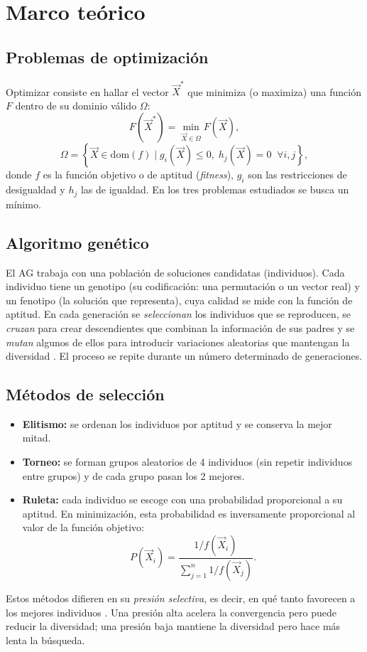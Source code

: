 \documentclass[conference]{IEEEtran}
\begin{document}
\section{Marco te\'orico}
\subsection{Problemas de optimizaci\'on}
Optimizar consiste en hallar el vector $\vec{X}^*$ que minimiza (o maximiza) una funci\'on $F$ dentro de su dominio v\'alido $\Omega$:
\begin{equation}
F(\vec{X}^*) = \min_{\vec{X}\in\Omega} F(\vec{X}),
\end{equation}
\begin{equation}
\Omega = \left\{\vec{X}\in \mathrm{dom}(f) \mid g_i(\vec{X})\le 0,\; h_j(\vec{X})=0 \;\; \forall i,j \right\},
\end{equation}
donde $f$ es la funci\'on objetivo o de aptitud (\emph{fitness}), $g_i$ son las restricciones de desigualdad y $h_j$ las de igualdad. En los tres problemas estudiados se busca un m\'inimo.

\subsection{Algoritmo gen\'etico}
El AG trabaja con una poblaci\'on de soluciones candidatas (individuos). Cada individuo tiene un genotipo (su codificaci\'on: una permutaci\'on o un vector real) y un fenotipo (la soluci\'on que representa), cuya calidad se mide con la funci\'on de aptitud. En cada generaci\'on se \emph{seleccionan} los individuos que se reproducen, se \emph{cruzan} para crear descendientes que combinan la informaci\'on de sus padres y se \emph{mutan} algunos de ellos para introducir variaciones aleatorias que mantengan la diversidad \cite{holland,goldberg}. El proceso se repite durante un n\'umero determinado de generaciones.

\subsection{M\'etodos de selecci\'on}
\begin{itemize}
\item \textbf{Elitismo:} se ordenan los individuos por aptitud y se conserva la mejor mitad.
\item \textbf{Torneo:} se forman grupos aleatorios de 4 individuos (sin repetir individuos entre grupos) y de cada grupo pasan los 2 mejores.
\item \textbf{Ruleta:} cada individuo se escoge con una probabilidad proporcional a su aptitud. En minimizaci\'on, esta probabilidad es inversamente proporcional al valor de la funci\'on objetivo:
\begin{equation}
P(\vec{X}_i) = \frac{1/f(\vec{X}_i)}{\sum_{j=1}^{n} 1/f(\vec{X}_j)}.
\label{eq:ruleta}
\end{equation}
\end{itemize}
Estos m\'etodos difieren en su \emph{presi\'on selectiva}, es decir, en qu\'e tanto favorecen a los mejores individuos \cite{goldbergdeb}. Una presi\'on alta acelera la convergencia pero puede reducir la diversidad; una presi\'on baja mantiene la diversidad pero hace m\'as lenta la b\'usqueda.
\end{document}
